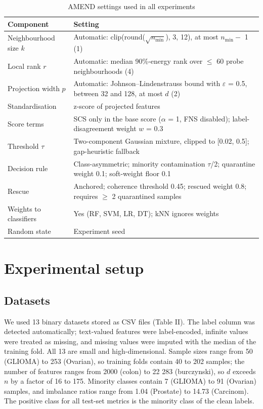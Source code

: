 \documentclass[conference]{IEEEtran}
\begin{document}
\begin{table}[!t]
\centering
\footnotesize
\caption{AMEND settings used in all experiments}
\label{tab:1}
\setlength{\tabcolsep}{3.5pt}
\begin{tabular}{>{\raggedright\arraybackslash}p{0.2765\dimexpr\linewidth-4\tabcolsep\relax}>{\raggedright\arraybackslash}p{0.7235\dimexpr\linewidth-4\tabcolsep\relax}}
\hline
Component & Setting \\
\hline
Neighbourhood size $k$ & Automatic: clip(round($\sqrt{n_{\min}}$), 3, 12), at most $n_{\mathrm{min}} -$ 1 (1) \\
Local rank $r$ & Automatic: median 90\%-energy rank over $\le $ 60 probe neighbourhoods (4) \\
Projection width $p$ & Automatic: Johnson--Lindenstrauss bound with $\varepsilon $ = 0.5, between 32 and 128, at most $d$ (2) \\
Standardisation & z-score of projected features \\
Score terms & SCS only in the base score ($\alpha $ = 1, FNS disabled); label-disagreement weight $w$ = 0.3 \\
Threshold $\tau $ & Two-component Gaussian mixture, clipped to {[}0.02, 0.5{]}; gap-heuristic fallback \\
Decision rule & Class-asymmetric; minority contamination $\tau $/2; quarantine weight 0.1; soft-weight floor 0.1 \\
Rescue & Anchored; coherence threshold 0.45; rescued weight 0.8; requires $\ge $ 2 quarantined samples \\
Weights to classifiers & Yes (RF, SVM, LR, DT); kNN ignores weights \\
Random state & Experiment seed \\
\hline
\end{tabular}
\end{table}

\section{Experimental setup}\label{sec:experimental-setup}

\subsection{Datasets}\label{sec:datasets}

We used 13 binary datasets stored as CSV files (Table II). The label column was detected automatically; text-valued features were label-encoded, infinite values were treated as missing, and missing values were imputed with the median of the training fold. All 13 are small and high-dimensional. Sample sizes range from 50 (GLIOMA) to 253 (Ovarian), so training folds contain 40 to 202 samples; the number of features ranges from 2000 (colon) to 22 283 (burczynski), so $d$ exceeds $n$ by a factor of 16 to 175. Minority classes contain 7 (GLIOMA) to 91 (Ovarian) samples, and imbalance ratios range from 1.04 (Prostate) to 14.73 (Carcinom). The positive class for all test-set metrics is the minority class of the clean labels.
\end{document}

